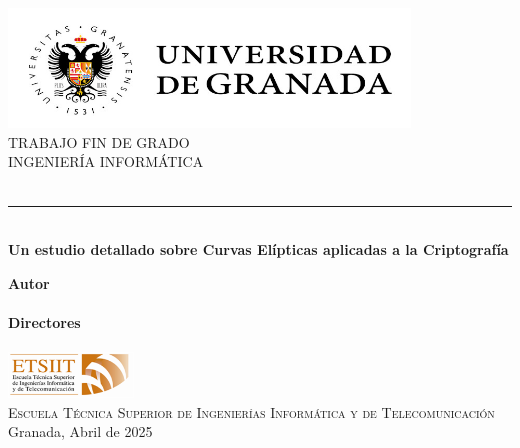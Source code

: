 \begin{titlepage}

  \newlength{\centeroffset}
  \setlength{\centeroffset}{-0.5\oddsidemargin}
  \addtolength{\centeroffset}{0.5\evensidemargin}
  \thispagestyle{empty}

  \noindent\hspace*{\centeroffset}\begin{minipage}{\textwidth}
    \centering
    \includegraphics[width=0.8\textwidth]{imagenes/logo_ugr.jpg}\\[1.2cm]

    \textsc{\Large TRABAJO FIN DE GRADO\\[0.2cm]}
    \textsc{INGENIERÍA INFORMÁTICA}\\[0.8cm]

    {\huge\bfseries \myTitle\\[1ex]}
    \noindent\rule[-1ex]{\textwidth}{2pt}\\[2.5ex]
    {\large\bfseries Un estudio detallado sobre Curvas Elípticas aplicadas a la Criptografía}
  \end{minipage}

  \vspace{2cm}
  \noindent\hspace*{\centeroffset}\begin{minipage}{\textwidth}
    \centering

    \textbf{Autor}\\[0.5ex]
    {\myName}\\[2ex]

    \textbf{Directores}\\[0.5ex]
    {\myProf}\\[2cm]

    \includegraphics[width=0.25\textwidth]{imagenes/etsiit_logo.png}\\[0.5cm]
    \textsc{Escuela Técnica Superior de Ingenierías Informática y de Telecomunicación}\\
    Granada, Abril de 2025
  \end{minipage}

\end{titlepage}
